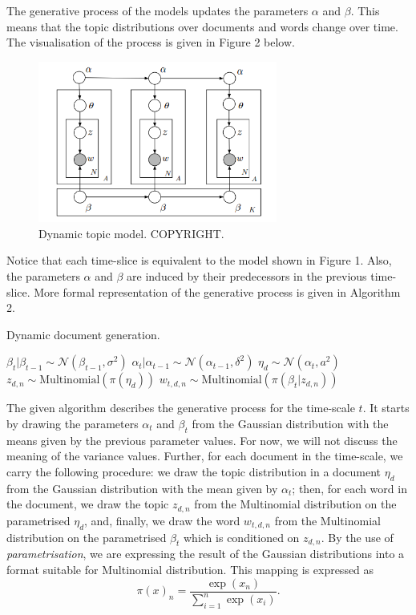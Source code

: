 \documentclass{mprop}
\begin{document}
\par The generative process of the models updates the parameters $\alpha$ and $\beta$. This means that the topic distributions over documents and words change over time. The visualisation of the process is given in Figure 2 below.
\begin{figure}[H]
  \centering
  \includegraphics[width=0.7\textwidth]{dynamic_topic_model}
  \caption{Dynamic topic model. COPYRIGHT.}
  \label{fig:dtm}
\end{figure}
Notice that each time-slice is equivalent to the model shown in Figure 1. Also, the parameters $\alpha$ and $\beta$ are induced by their predecessors in the previous time-slice. More formal representation of the generative process is given in Algorithm 2. 
\begin{algorithm}[H]
\caption{Dynamic document generation.}
\label{alg:dynamic_document_generation}
\begin{algorithmic}[2]
\State $\beta_t | \beta_{t-1} \sim \mathcal{N}(\beta_{t-1}, \sigma^2)$
\State $\alpha_t | \alpha_{t-1} \sim \mathcal{N}(\alpha_{t-1}, \delta^2)$
\State $\eta_d \sim \mathcal{N}(\alpha_{t}, a^2)$
\State $z_{d, n} \sim \mbox{Multinomial}(\pi(\eta_d))$
\State $w_{t, d, n} \sim \mbox{Multinomial}(\pi(\beta_t | z_{d, n}))$
\EndFor
\EndFor
\end{algorithmic}
\end{algorithm}
The given algorithm describes the generative process for the time-scale $t$. It starts by drawing the parameters $\alpha_t$ and $\beta_t$ from the Gaussian distribution with the means given by the previous parameter values. For now, we will not discuss the meaning of the variance values. Further, for each document in the time-scale, we carry the following procedure: we draw the topic distribution in a document $\eta_d$ from the Gaussian distribution with the mean given by $\alpha_t$; then, for each word in the document, we draw the topic $z_{d, n}$ from the Multinomial distribution on the parametrised $\eta_d$, and, finally, we draw the word $w_{t, d, n}$ from the Multinomial distribution on the parametrised $\beta_t$ which is conditioned on $z_{d, n}$. By the use of \textit{parametrisation}, we are expressing the result of the Gaussian distributions into a format suitable for Multinomial distribution. This mapping is expressed as
\begin{equation}
\pi(x)_n = \dfrac{\exp{(x_n)}}{\sum^n_{i=1}\exp{(x_i)}}.
\end{equation}
\end{document}
